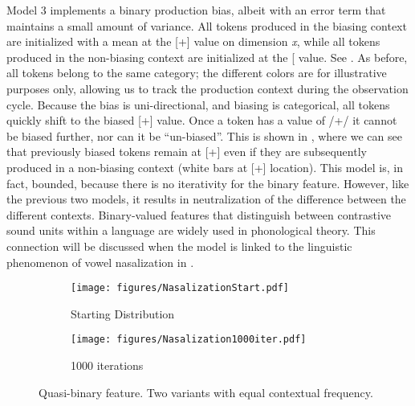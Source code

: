 Model 3 implements a binary production bias, albeit with an error
term that maintains a small amount of variance. All tokens produced
in the biasing context are initialized with a mean at the {[}+{]} value
on dimension \emph{x}, while all tokens produced in the non-biasing
context are initialized at the {[}\textminus{]} value. See .
As before, all tokens belong to the same category; the different colors
are for illustrative purposes only, allowing us to track the production
context during the observation cycle. Because the bias is uni-directional,
and biasing is categorical, all tokens quickly shift to the biased
{[}+{]} value. Once a token has a value of /+/ it cannot be biased
further, nor can it be ``un-biased''. This is shown in ,
where we can see that previously biased tokens remain at {[}+{]} even
if they are subsequently produced in a non-biasing context (white
bars at {[}+{]} location). This model is, in fact, bounded, because
there is no iterativity for the binary feature. However, like the
previous two models, it results in neutralization of the difference
between the different contexts. Binary-valued features that distinguish
between contrastive sound units within a language are widely used
in phonological theory. This connection will be discussed when the
model is linked to the linguistic phenomenon of vowel nasalization
in .

\begin{figure}[H]

\begin{subfigure}[t]{.45\textwidth}
        \texttt{[image: figures/NasalizationStart.pdf]}
        \caption{\label{fig:binary-Starting-Distribution}Starting Distribution}
    \end{subfigure}\hfill
    \begin{subfigure}[t]{.45\textwidth}
        \texttt{[image: figures/Nasalization1000iter.pdf]}
        \caption{\label{fig:binary-1000iter}1000 iterations}
    \end{subfigure}
% 
% 

\caption{\label{fig:Context Mismatch Features}Quasi-binary feature. Two variants
with equal contextual frequency.}
\end{figure}
